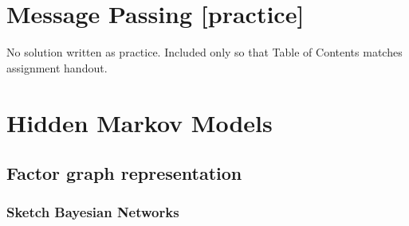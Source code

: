 \documentclass[a4paper,12pt]{article}
\newcommand{\ci}{\perp\!\!\!\perp}
\begin{document}

\clearpage
\section{Message Passing [practice]}
No solution written as practice. 
Included only so that Table of Contents matches assignment handout.

\section{Hidden Markov Models}
\subsection{Factor graph representation}

\subsubsection{Sketch Bayesian Networks}
\end{document}
